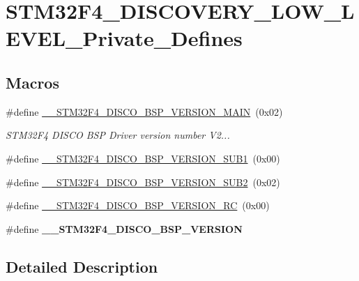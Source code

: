 \hypertarget{group__STM32F4__DISCOVERY__LOW__LEVEL__Private__Defines}{\section{S\-T\-M32\-F4\-\_\-\-D\-I\-S\-C\-O\-V\-E\-R\-Y\-\_\-\-L\-O\-W\-\_\-\-L\-E\-V\-E\-L\-\_\-\-Private\-\_\-\-Defines}
\label{group__STM32F4__DISCOVERY__LOW__LEVEL__Private__Defines}
}
\subsection*{Macros}
\begin{DoxyCompactItemize}
\item 
\#define \hyperlink{group__STM32F4__DISCOVERY__LOW__LEVEL__Private__Defines_ga9b9ce78017b00a5149e65e663676bf1a}{\-\_\-\-\_\-\-S\-T\-M32\-F4\-\_\-\-D\-I\-S\-C\-O\-\_\-\-B\-S\-P\-\_\-\-V\-E\-R\-S\-I\-O\-N\-\_\-\-M\-A\-I\-N}~(0x02)
\begin{DoxyCompactList}\small\item\em S\-T\-M32\-F4 D\-I\-S\-C\-O B\-S\-P Driver version number V2... \end{DoxyCompactList}\item 
\#define \hyperlink{group__STM32F4__DISCOVERY__LOW__LEVEL__Private__Defines_ga53a734726d1b7247bb620a56de8d154e}{\-\_\-\-\_\-\-S\-T\-M32\-F4\-\_\-\-D\-I\-S\-C\-O\-\_\-\-B\-S\-P\-\_\-\-V\-E\-R\-S\-I\-O\-N\-\_\-\-S\-U\-B1}~(0x00)
\item 
\#define \hyperlink{group__STM32F4__DISCOVERY__LOW__LEVEL__Private__Defines_ga56f24ebf9cca2d997596f4eb6aba19fc}{\-\_\-\-\_\-\-S\-T\-M32\-F4\-\_\-\-D\-I\-S\-C\-O\-\_\-\-B\-S\-P\-\_\-\-V\-E\-R\-S\-I\-O\-N\-\_\-\-S\-U\-B2}~(0x02)
\item 
\#define \hyperlink{group__STM32F4__DISCOVERY__LOW__LEVEL__Private__Defines_ga49aad18854e17cbfa696c09b9c02913c}{\-\_\-\-\_\-\-S\-T\-M32\-F4\-\_\-\-D\-I\-S\-C\-O\-\_\-\-B\-S\-P\-\_\-\-V\-E\-R\-S\-I\-O\-N\-\_\-\-R\-C}~(0x00)
\item 
\#define {\bfseries \-\_\-\-\_\-\-S\-T\-M32\-F4\-\_\-\-D\-I\-S\-C\-O\-\_\-\-B\-S\-P\-\_\-\-V\-E\-R\-S\-I\-O\-N}
\end{DoxyCompactItemize}


\subsection{Detailed Description}


